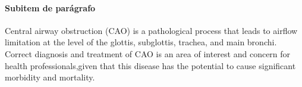 \documentclass[10pt,a4paper]{article}
\begin{document}
      \paragraph{Subitem de parágrafo}  %
	  \label{Subitem de parágrafo}

      Central airway obstruction (CAO) is a pathological process that leads to 
      airflow limitation at the level of the glottis, subglottis, trachea, and main bronchi. 
      Correct diagnosis and treatment of CAO is an area of interest and concern for health 
      professionals,given that this disease has the potential to cause significant morbidity and mortality.
 
\end{document}
